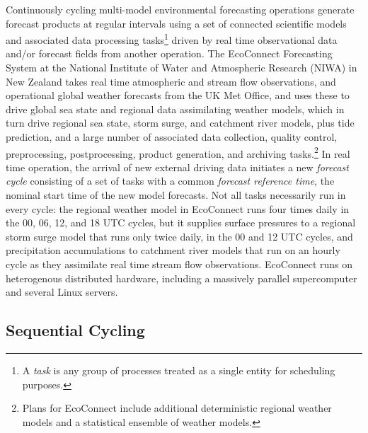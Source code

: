 \documentclass[11pt,a4paper]{article}
\begin{document}
Continuously cycling multi-model environmental forecasting operations
generate forecast products at regular intervals using a set of connected
scientific models and associated data processing tasks\footnote{A {\em
task} is any group of processes treated as a single entity for
scheduling purposes.} driven by real time observational data and/or
forecast fields from another operation. The EcoConnect Forecasting
System at the National Institute of Water and Atmospheric Research
(NIWA) in New Zealand takes real time atmospheric and stream flow
observations, and operational global weather forecasts from the UK Met
Office, and uses these to drive global sea state and regional data
assimilating weather models, which in turn drive regional sea state,
storm surge, and catchment river models, plus tide prediction, and a
large number of associated data collection, quality control,
preprocessing, postprocessing, product generation, and archiving
tasks.\footnote{Plans for EcoConnect include additional deterministic
regional weather models and a statistical ensemble of weather models.}
In real time operation, the arrival of new external driving data
initiates a new {\em forecast cycle} consisting of a set of tasks with a
common {\em forecast reference time}, the nominal start time of the new
model forecasts. Not all tasks necessarily run in every cycle: the
regional weather model in EcoConnect runs four times daily in the 00,
06, 12, and 18 UTC cycles, but it supplies surface pressures to a
regional storm surge model that runs only twice daily, in the 00 and 12
UTC cycles, and precipitation accumulations to catchment river models
that run on an hourly cycle as they assimilate real time stream flow
observations. EcoConnect runs on heterogenous distributed hardware,
including a massively parallel supercomputer and several Linux servers. 

\subsection{Sequential Cycling}
\end{document}
